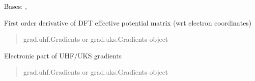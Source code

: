 \documentclass[letterpaper,10pt,english]{sphinxmanual}
\begin{document}
\begin{fulllineitems}
\label{\detokenize{fcdft.grad:fcdft.grad.uks.Gradients}}
\pysigstartsignatures
\pysiglinewithargsret
{}
{}
{}
\pysigstopsignatures
\sphinxAtStartPar
Bases: , {\hyperref[\detokenize{fcdft.grad:fcdft.grad.rks.GradientsBase}]{}}

\begin{fulllineitems}
\label{\detokenize{fcdft.grad:fcdft.grad.uks.Gradients.get_veff}}
\pysigstartsignatures
\pysiglinewithargsret
{}
{\sphinxparamcomma {}}
{}
\pysigstopsignatures
\sphinxAtStartPar
First order derivative of DFT effective potential matrix (wrt electron coordinates)
\begin{quote}\begin{description}
\sphinxAtStartPar
{} \textendash{} grad.uhf.Gradients or grad.uks.Gradients object

\end{description}\end{quote}

\end{fulllineitems}


\begin{fulllineitems}
\label{\detokenize{fcdft.grad:fcdft.grad.uks.Gradients.grad_elec}}
\pysigstartsignatures
\pysiglinewithargsret
{}
{\sphinxparamcomma {}\sphinxparamcomma {}\sphinxparamcomma {}}
{}
\pysigstopsignatures
\sphinxAtStartPar
Electronic part of UHF/UKS gradients
\begin{quote}\begin{description}
\sphinxAtStartPar
{} \textendash{} grad.uhf.Gradients or grad.uks.Gradients object


\end{description}
\end{quote}
\end{fulllineitems}
\end{fulllineitems}
\end{document}
